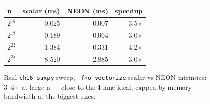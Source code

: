 \begin{figure}[htbp]
\centering
\begin{tabular}{lrrr}
\toprule
n & scalar (ms) & NEON (ms) & speedup \\
\midrule
$2^{16}$ & 0.025 & 0.007 & 3.5$\times$ \\
$2^{19}$ & 0.189 & 0.064 & 3.0$\times$ \\
$2^{22}$ & 1.384 & 0.331 & 4.2$\times$ \\
$2^{25}$ & 8.520 & 2.885 & 3.0$\times$ \\
\bottomrule
\end{tabular}
\caption{Real \texttt{ch16\_saxpy} sweep, \texttt{-fno-vectorize}
scalar vs NEON intrinsics: 3--4$\times$ at large n --- close to the
4-lane ideal, capped by memory bandwidth at the biggest sizes.}
\label{fig:saxpy16}
\end{figure}
